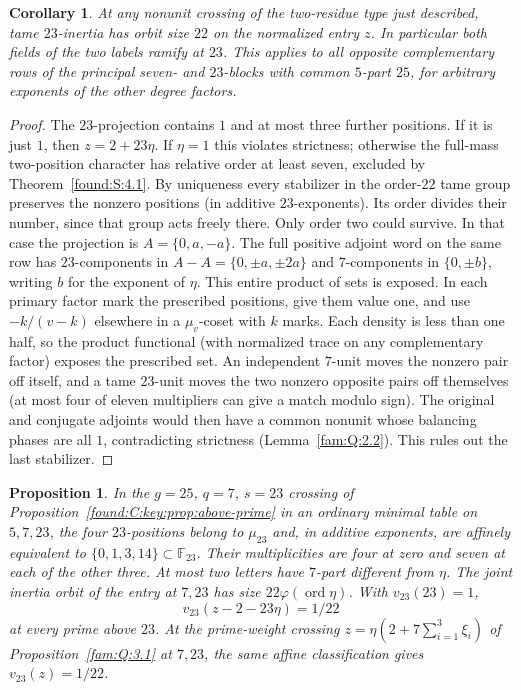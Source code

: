 \documentclass[11pt,a4paper]{article}
\numberwithin{equation}{section}
\newtheorem{proposition}[theorem]{Proposition}
\newtheorem{corollary}[theorem]{Corollary}
\theoremstyle{remark}
\begin{document}
\begin{corollary}\label{found:C:3.2}\label{found:C:key:cor:orbit22}
At any nonunit crossing of the two-residue type just described,
tame $23$-inertia has orbit size $22$ on the normalized entry $z$.
In particular both fields of the two labels ramify at $23$.
This applies to all opposite complementary rows of the principal
seven- and $23$-blocks with common $5$-part $25$, for arbitrary
exponents of the other degree factors.
\end{corollary}
\begin{proof}
The $23$-projection contains $1$ and at most three further positions.
If it is just $1$, then $z=2+23\eta$. If $\eta=1$ this violates
strictness; otherwise the full-mass two-position character has
relative order at least seven, excluded by Theorem~\ref{found:S:4.1}.
By uniqueness every stabilizer in the order-$22$ tame group preserves
the nonzero positions (in additive $23$-exponents). Its order divides
their number, since that group acts freely there. Only order two
could survive. In that case the projection is $A=\{0,a,-a\}$.
The full positive adjoint word on the same row has $23$-components
in $A-A=\{0,\pm a,\pm2a\}$ and $7$-components in
$\{0,\pm b\}$, writing $b$ for the exponent of $\eta$.
This entire product of sets is exposed. In each primary factor mark
the prescribed positions, give them value one, and use
$-k/(v-k)$ elsewhere in a $\mu_v$-coset with $k$ marks. Each density
is less than one half, so the product functional (with normalized
trace on any complementary factor) exposes the prescribed set.
An independent $7$-unit moves the nonzero pair off itself, and a
tame $23$-unit moves the two nonzero opposite pairs off themselves
(at most four of eleven multipliers can give a match modulo sign).
The original and conjugate adjoints would then have a common nonunit
whose balancing phases are all $1$, contradicting strictness (Lemma~\ref{fam:Q:2.2}). This rules out the last stabilizer.
\end{proof}
\begin{proposition}\label{found:C:3.3}\label{found:C:key:prop:fourmarks}
In the $g=25$, $q=7$, $s=23$ crossing of
Proposition~\ref{found:C:key:prop:above-prime} in an ordinary minimal table on
$5,7,23$, the four $23$-positions belong to $\mu_{23}$ and, in additive
exponents, are affinely equivalent to $\{0,1,3,14\}\subset\mathbb F_{23}$.
Their multiplicities are four at zero and seven at each of the other
three. At most two letters have $7$-part different from $\eta$.
The joint inertia orbit of the entry at $7,23$ has size
$22\varphi(\operatorname{ord}\eta)$. With $v_{23}(23)=1$,
\[
 v_{23}(z-2-23\eta)=1/22
\]
at every prime above $23$. At the prime-weight crossing
$z=\eta(2+7\sum_{i=1}^3\xi_i)$ of Proposition~\ref{fam:Q:3.1} at $7,23$,
the same affine classification gives $v_{23}(z)=1/22$.
\end{proposition}
\end{document}
